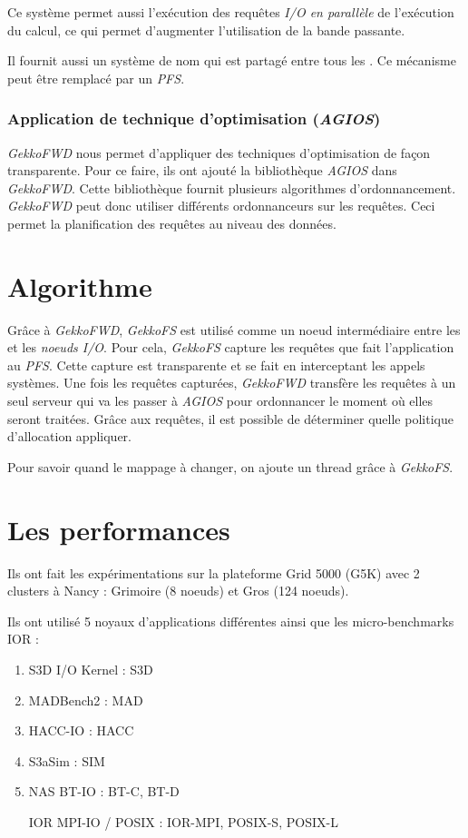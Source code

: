 \documentclass[10pt, a4paper]{article}
\begin{document}
Ce système permet aussi l'exécution des requêtes \emph{I/O en parallèle} de l'exécution du calcul, ce qui permet d'augmenter l'utilisation de la bande passante.

Il fournit aussi un système de nom qui est partagé entre tous les \noeudsDeCalculs{}. Ce mécanisme peut être remplacé par un \emph{PFS}.

\subsubsection{Application de technique d'optimisation (\emph{AGIOS})}

\emph{GekkoFWD} nous permet d'appliquer des techniques d'optimisation de façon transparente. Pour ce faire, ils ont ajouté la bibliothèque \emph{AGIOS} dans \emph{GekkoFWD}. Cette bibliothèque fournit plusieurs algorithmes d'ordonnancement.
\emph{GekkoFWD} peut donc utiliser différents ordonnanceurs sur les requêtes. Ceci permet la planification des requêtes au niveau des données.

\section{Algorithme}

Grâce à \emph{GekkoFWD}, \emph{GekkoFS} est utilisé comme un noeud intermédiaire entre les \noeudsDeCalculs{} et les \emph{noeuds I/O}. Pour cela, \emph{GekkoFS} capture les requêtes que fait l'application au \emph{PFS}. Cette capture est transparente et se fait en interceptant les appels systèmes. Une fois les requêtes capturées, \emph{GekkoFWD} transfère les requêtes à un seul serveur qui va les passer à \emph{AGIOS} pour ordonnancer le moment où elles seront traitées. Grâce aux requêtes, il est possible de déterminer quelle politique d'allocation appliquer.

Pour savoir quand le mappage à changer, on ajoute un thread grâce à \emph{GekkoFS}.

\section{Les performances}

Ils ont fait les expérimentations sur la plateforme Grid 5000 (G5K) avec 2 clusters à Nancy : Grimoire (8 noeuds) et Gros (124 noeuds).

Ils ont utilisé 5 noyaux d'applications différentes ainsi que les micro-benchmarks IOR :
\begin{enumerate}
  \item S3D I/O Kernel : S3D
  \item MADBench2 : MAD
  \item HACC-IO : HACC
  \item S3aSim : SIM
  \item NAS BT-IO : BT-C, BT-D
  \item [IOR] MPI-IO / POSIX : IOR-MPI, POSIX-S, POSIX-L
\end{enumerate}
\end{document}
